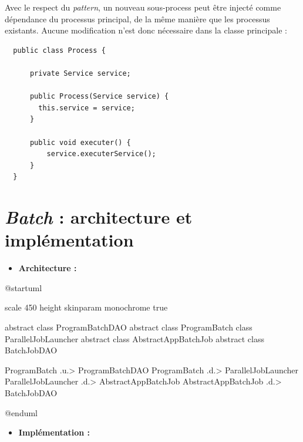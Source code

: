 \documentclass[a4paper, 12pt]{report}
\begin{document}
Avec le respect du \textit{pattern}, un nouveau sous-process peut être injecté comme dépendance du processus principal, de la même manière que les processus existants. Aucune modification n'est donc nécessaire dans la classe principale :\\

\begin{lstlisting}
  public class Process {

      private Service service;

      public Process(Service service) {
        this.service = service;
      }
  
      public void executer() {
          service.executerService();
      }    
  }
\end{lstlisting}

\chapter{\textit{Batch} : architecture et implémentation}
\label{appendix:batch}

\begin{itemize}
  \item \textbf{Architecture :}\\
\end{itemize}

\begin{center}
  \begin{plantuml}
    @startuml

    scale 450 height
    skinparam monochrome true

    abstract class ProgramBatchDAO
    abstract class ProgramBatch
    class ParallelJobLauncher
    abstract class AbstractAppBatchJob
    abstract class BatchJobDAO

    ProgramBatch .u.> ProgramBatchDAO
    ProgramBatch .d.> ParallelJobLauncher
    ParallelJobLauncher .d.> AbstractAppBatchJob
    AbstractAppBatchJob .d.> BatchJobDAO

    @enduml
  \end{plantuml}
\end{center}
\clearpage

\begin{itemize}
  \item \textbf{Implémentation :}\\
\end{itemize}
\end{document}
